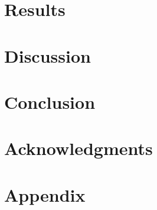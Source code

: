 \documentclass[preprint,12pt]{elsarticle} %
\begin{document}
\section{Results}
\label{ch:results}



\section{Discussion}
\label{ch:discussion}


\section{Conclusion}
\label{ch:conclusion}


\section{Acknowledgments}
\label{ch:acknowledgments}


\section{Appendix}
\label{ch:appendix}



   
  
\end{document}
